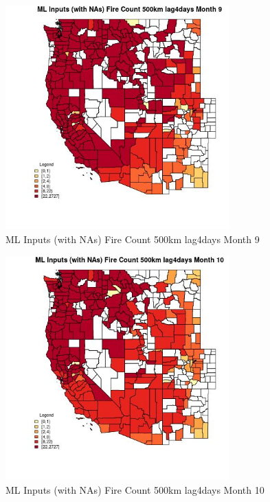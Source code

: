 \begin{figure} 
\centering  
\includegraphics[width=0.77\textwidth]{Code_Outputs/Report_ML_input_PM25_Step4_part_f_de_duplicated_aveswNAs_CountyFire_Count_500km_lag4daysmedianMonth9.jpg} 
\caption{\label{fig:Report_ML_input_PM25_Step4_part_f_de_duplicated_aveswNAsCountyFire_Count_500km_lag4daysmedianMonth9}ML Inputs (with NAs) Fire Count 500km lag4days Month 9} 
\end{figure} 
 

\begin{figure} 
\centering  
\includegraphics[width=0.77\textwidth]{Code_Outputs/Report_ML_input_PM25_Step4_part_f_de_duplicated_aveswNAs_CountyFire_Count_500km_lag4daysmedianMonth10.jpg} 
\caption{\label{fig:Report_ML_input_PM25_Step4_part_f_de_duplicated_aveswNAsCountyFire_Count_500km_lag4daysmedianMonth10}ML Inputs (with NAs) Fire Count 500km lag4days Month 10} 
\end{figure} 
 

